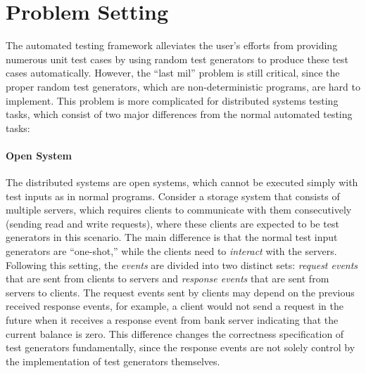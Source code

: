 \section{Problem Setting}

The automated testing framework alleviates the user's efforts from providing numerous unit test cases by using random test generators to produce these test cases automatically. However, the ``last mil'' problem is still critical, since the proper random test generators, which are non-deterministic programs, are hard to implement. This problem is more complicated for distributed systems testing tasks, which consist of two major differences from the normal automated testing tasks:

\paragraph{Open System} The distributed systems are open systems, which cannot be executed simply with test inputs as in normal programs. Consider a storage system that consists of multiple servers, which requires clients to communicate with them consecutively (sending read and write requests), where these clients are expected to be test generators in this scenario. The main difference is that the normal test input generators are ``one-shot,'' while the clients need to \emph{interact} with the servers. Following this setting, the \emph{events} are divided into two distinct sets: \emph{request events} that are sent from clients to servers and \emph{response events} that are sent from servers to clients. The request events sent by clients may depend on the previous received response events, for example, a client would not send a  request in the future when it receives a response event from bank server indicating that the current balance is zero. This difference changes the correctness specification of test generators  fundamentally, since the response events are not solely control by the implementation of test generators themselves.

